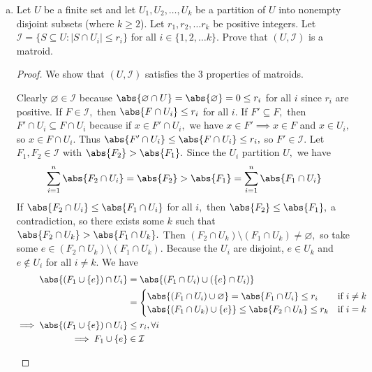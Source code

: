 \documentclass{article}
\begin{document}
\begin{enumerate}[(a)]
	\item Let $U$ be a finite set and let $U_1, U_2, \dots, U_k$ be a partition of $U$ into nonempty disjoint subsets (where $k \geq 2$).  Let $r_1, r_2, \dots r_k$ be positive integers.  Let $\mathcal I = \{ S \subseteq U : |S \cap U_i| \leq r_i\}$ for all $i \in \{1,2,\dots k\}$.  Prove that $(U, \mathcal I)$ is a matroid.  
		\begin{proof}
			We show that $(U, \mathcal I)$ satisfies the 3 properties of matroids. 
			\begin{enumerate}[(i)]
				\ii Clearly $\varnothing\in\mathcal I$ because $\abs{\varnothing\cap U}=\abs{\varnothing}=0\le r_i$ for all $i$ since $r_i$ are positive.
				\ii If $F\in \mathcal I,$ then $\abs{F\cap U_i}\le r_i$ for all $i.$ If $F'\subseteq F,$ then $F'\cap U_i\subseteq F\cap U_i$ because if $x\in F'\cap U_i,$ we have $x\in F'\implies x\in F$ and $x\in U_i,$ so $x\in F\cap U_i.$ Thus $\abs{F'\cap U_i}\le \abs{F\cap U_i}\le r_i,$ so $F'\in\mathcal I.$
				\ii Let $F_1, F_2\in\mathcal I$ with $\abs{F_2}>\abs{F_1}.$ Since the $U_i$ partition $U,$ we have
				\begin{align*}
					\sum_{i=1}^{n} \abs{F_2\cap U_i} = \abs{F_2} > \abs{F_1} = \sum_{i=1}^{n} \abs{F_1\cap U_i}
				\end{align*}
				If $\abs{F_2\cap U_i}\le\abs{F_1\cap U_i}$ for all $i,$ then $\abs{F_2}\le \abs{F_1},$ a contradiction, so there exists some $k$ such that $\abs{F_2\cap U_k}>\abs{F_1\cap U_k}.$ Then $(F_2\cap U_k)\setminus(F_1\cap U_k)\neq\varnothing,$ so take some $e\in (F_2\cap U_k)\setminus(F_1\cap U_k).$ Because the $U_i$ are disjoint, $e\in U_k$ and $e\notin U_i$ for all $i\neq k.$ We have
				\begin{align*}
					\abs{\left( F_1\cup \left\{ e \right\} \right)\cap U_i} &= \abs{\left( F_1\cap U_i \right)\cup \left( \left\{ e \right\}\cap U_i \right)} \\
					&= \begin{cases}
						\abs{(F_1\cap U_i)\cup\varnothing} = \abs{F_1\cap U_i} \le r_i & \text{if }i\neq k \\
						\abs{(F_1\cap U_k)\cup \left\{ e \right\}} \le \abs{F_2\cap U_k} \le r_k & \text{if } i=k
					\end{cases} \\
					\implies \abs{(F_1\cup \left\{ e \right\})\cap U_i} &\le r_i, \forall i \\
					\implies F_1\cup \left\{ e \right\}&\in \mathcal I
				\end{align*}
			\end{enumerate}
		\end{proof}

\end{enumerate}
\end{document}
